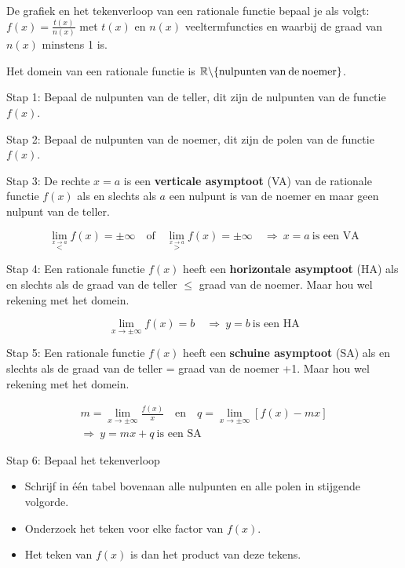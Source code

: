 \begin{ftonthoud}
	De grafiek en het tekenverloop van een rationale functie bepaal je
als volgt: $f(x)=\frac{t(x)}{n(x)}$ met $t(x)$ en $n(x)$ veeltermfuncties
en waarbij de graad van $n(x)$ minstens 1 is.

Het domein van een rationale functie is $\mathbb{R\setminus}\textrm{\{nulpunten\:van\:de\:noemer\}}$.

Stap 1: Bepaal de nulpunten van de teller, dit zijn de nulpunten van
de functie $f(x)$.

Stap 2: Bepaal de nulpunten van de noemer, dit zijn de polen van de
functie $f(x)$.

Stap 3: De rechte $x=a$ is een \textbf{verticale asymptoot} (VA)
van de rationale functie $f(x)$ als en slechts als $a$ een nulpunt
is van de noemer en maar geen nulpunt van de teller.

\begin{equation*}
\lim_{\overset{x\rightarrow a}{<}}f(x)=\pm\infty\quad\textrm{of}\quad \lim_{\overset{x\rightarrow a}{>}}f(x)=\pm\infty\quad\Rightarrow\:x=a\:\textrm{is een VA}
\end{equation*}


Stap 4: Een rationale functie $f(x)$ heeft een \textbf{horizontale
asymptoot} (HA) als en slechts als de graad van de teller \ensuremath{\le}
graad van de noemer. Maar hou wel rekening met het domein.

\begin{equation*}
\lim_{x\to\pm\infty}f(x)=b\quad\Rightarrow\:y=b\:\textrm{is een HA}
\end{equation*}

Stap 5: Een rationale functie $f(x)$ heeft een \textbf{schuine asymptoot}
(SA) als en slechts als de graad van de teller = graad van de noemer
+1. Maar hou wel rekening met het domein.

\begin{eqnarray*}
m= \lim_{x\to\pm\infty}\frac{f(x)}{x}\quad\textrm{en}\quad
q=\lim_{x\to\pm\infty}\left[f(x)-mx\right] \\
\Rightarrow\:y=mx+q\:\textrm{is een SA}
\end{eqnarray*}

Stap 6: Bepaal het tekenverloop
\begin{itemize}
\item Schrijf in \'e\'en tabel bovenaan alle nulpunten en alle polen in stijgende
volgorde. 

\item Onderzoek het teken voor elke factor van $f(x)$.

\item Het teken van $f(x)$ is dan het product van deze tekens.

\end{itemize}

\end{ftonthoud}
